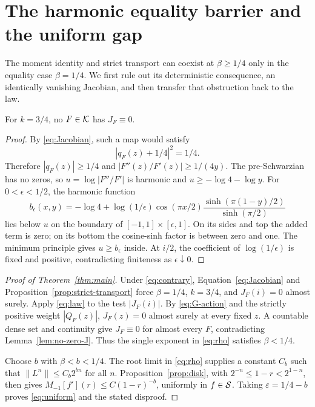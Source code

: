 \section{The harmonic equality barrier and the uniform gap}\label{sec:equality}

The moment identity and strict transport can coexist at
\(\beta\ge1/4\) only in the equality case \(\beta=1/4\).
We first rule out its deterministic consequence, an identically
vanishing Jacobian, and then transfer that obstruction back to the law.

\begin{lemma}\label{lem:no-zero-J}
For \(k=3/4\), no \(F\in\mathcal K\) has \(J_F\equiv0\).
\end{lemma}
\begin{proof}
By \eqref{eq:Jacobian}, such a map would satisfy
\[
 |q_F(z)+1/4|^2=1/4.
\]
Therefore \(|q_F(z)|\ge1/4\) and
\(|F''(z)/F'(z)|\ge1/(4y)\).
The pre-Schwarzian has no zeros, so
\(u=\log|F''/F'|\) is harmonic and \(u\ge-\log4-\log y\).
For \(0<\epsilon<1/2\), the harmonic function
\[
 b_\epsilon(x,y)=-\log4+
 \log(1/\epsilon)\cos(\pi x/2)
 \frac{\sinh(\pi(1-y)/2)}{\sinh(\pi/2)}
\]
lies below \(u\) on the boundary of
\([-1,1]\times[\epsilon,1]\).
On its sides and top the added term is zero; on its bottom
the cosine-sinh factor is between zero and one.
The minimum principle gives \(u\ge b_\epsilon\) inside.
At \(i/2\), the coefficient of \(\log(1/\epsilon)\) is fixed
and positive, contradicting finiteness as \(\epsilon\downarrow0\).
\end{proof}

\begin{proof}[Proof of Theorem~\ref{thm:main}]
Under \eqref{eq:contrary}, Equation~\eqref{eq:Jacobian} and
Proposition~\ref{prop:strict-transport} force
\(\beta=1/4\), \(k=3/4\), and \(J_F(i)=0\) almost surely.
Apply \eqref{eq:law} to the test \(|J_F(i)|\).
By \eqref{eq:G-action} and the strictly positive weight
\(|Q_F(z)|\), \(J_F(z)=0\) almost surely at every fixed \(z\).
A countable dense set and continuity give \(J_F\equiv0\)
for almost every \(F\), contradicting Lemma~\ref{lem:no-zero-J}.
Thus the single exponent in \eqref{eq:rho} satisfies \(\beta<1/4\).

Choose \(b\) with \(\beta<b<1/4\).
The root limit in \eqref{eq:rho} supplies a constant \(C_b\)
such that \(\|L^n\|\le C_b2^{bn}\) for all \(n\).
Proposition~\ref{prop:disk}, with \(2^{-n}\le1-r<2^{1-n}\),
then gives \(M_{-1}[f'](r)\le C(1-r)^{-b}\), uniformly in
\(f\in\mathcal S\). Taking \(\varepsilon=1/4-b\) proves
\eqref{eq:uniform} and the stated disproof.
\end{proof}

